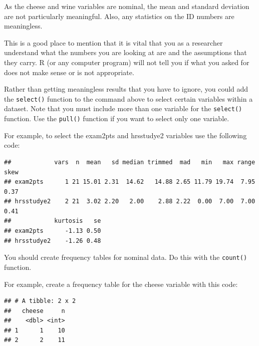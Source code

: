 \documentclass[
]{book}
\newenvironment{Shaded}{\begin{snugshade}}{\end{snugshade}}
\newcommand{\KeywordTok}[1]{\textcolor[rgb]{0.13,0.29,0.53}{\textbf{#1}}}
\newcommand{\NormalTok}[1]{#1}
\newcommand{\OperatorTok}[1]{\textcolor[rgb]{0.81,0.36,0.00}{\textbf{#1}}}
\newcommand{\StringTok}[1]{\textcolor[rgb]{0.31,0.60,0.02}{#1}}
\begin{document}
As the cheese and wine variables are nominal, the mean and standard deviation are not particularly meaningful. Also, any statistics on the ID numbers are meaningless.

This is a good place to mention that it is vital that you as a researcher understand what the numbers you are looking at are and the assumptions that they carry. R (or any computer program) will not tell you if what you asked for does not make sense or is not appropriate.

Rather than getting meaningless results that you have to ignore, you could add the \texttt{select()} function to the command above to select certain variables within a dataset. Note that you must include more than one variable for the \texttt{select()} function. Use the \texttt{pull()} function if you want to select only one variable.

For example, to select the exam2pts and hrsstudye2 variables use the following code:

\begin{Shaded}
\end{Shaded}

\begin{verbatim}
##            vars  n  mean   sd median trimmed  mad   min   max range skew
## exam2pts      1 21 15.01 2.31  14.62   14.88 2.65 11.79 19.74  7.95 0.37
## hrsstudye2    2 21  3.02 2.20   2.00    2.88 2.22  0.00  7.00  7.00 0.41
##            kurtosis   se
## exam2pts      -1.13 0.50
## hrsstudye2    -1.26 0.48
\end{verbatim}

You should create frequency tables for nominal data. Do this with the \texttt{count()} function.

For example, create a frequency table for the cheese variable with this code:

\begin{Shaded}
\end{Shaded}

\begin{verbatim}
## # A tibble: 2 x 2
##   cheese     n
##    <dbl> <int>
## 1      1    10
## 2      2    11
\end{verbatim}
\end{document}
